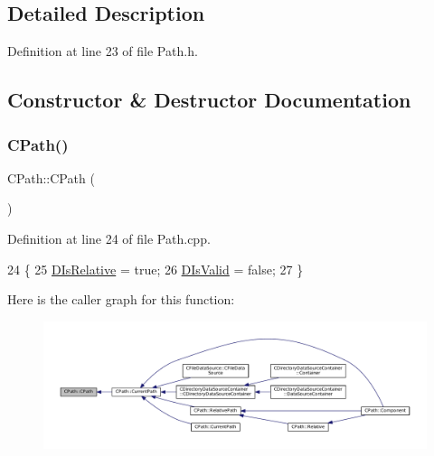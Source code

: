 \subsection{Detailed Description}


Definition at line 23 of file Path.\+h.



\subsection{Constructor \& Destructor Documentation}
\hypertarget{classCPath_a26b6e34c8019d440136848f809c13897}{}\label{classCPath_a26b6e34c8019d440136848f809c13897} 
\subsubsection{\texorpdfstring{C\+Path()}{CPath()}\hspace{0.1cm}{\footnotesize\ttfamily [1/3]}}
{\footnotesize\ttfamily C\+Path\+::\+C\+Path (\begin{DoxyParamCaption}{ }\end{DoxyParamCaption})}



Definition at line 24 of file Path.\+cpp.


\begin{DoxyCode}
24             \{
25     \hyperlink{classCPath_af705ff149bb2281c67afb84fff550eb9}{DIsRelative} = \textcolor{keyword}{true};
26     \hyperlink{classCPath_a992aca27a1cba1c3bae3d04438821192}{DIsValid} = \textcolor{keyword}{false};
27 \}
\end{DoxyCode}
Here is the caller graph for this function\+:
\nopagebreak
\begin{figure}[H]
\begin{center}
\leavevmode
\includegraphics[width=350pt]{classCPath_a26b6e34c8019d440136848f809c13897_icgraph}
\end{center}
\end{figure}
\hypertarget{classCPath_a728b9e9aea13c9dc51b9bb1f6dbc76fd}{}\label{classCPath_a728b9e9aea13c9dc51b9bb1f6dbc76fd} 
